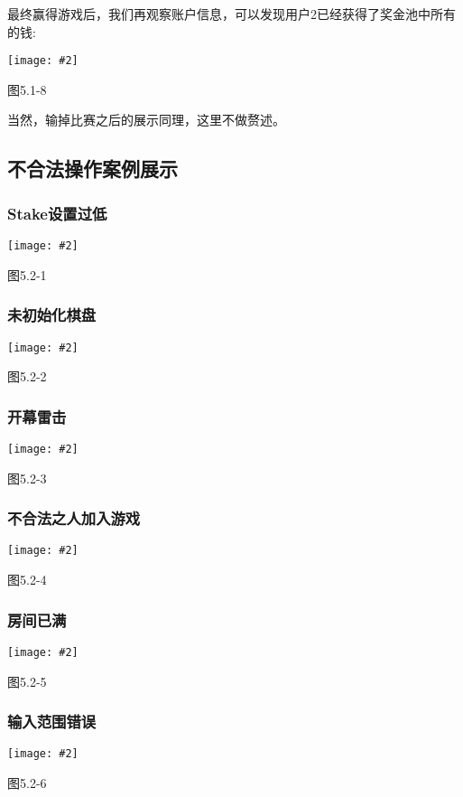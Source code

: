 \documentclass[UTF8]{ctexart}
\newcommand\picturehere[2][1]{\centerline{\texttt{[image: \#2]}}}
\begin{document}
	\indent 最终赢得游戏后，我们再观察账户信息，可以发现用户2已经获得了奖金池中所有的钱:\\
	\picturehere[1]{s20.png}
	\begin{center} 图5.1-8 \end{center} %

	\indent 当然，输掉比赛之后的展示同理，这里不做赘述。
	\newpage
	\subsection{不合法操作案例展示}
	\subsubsection{Stake设置过低}
	\picturehere[0.666]{s13.png}
	\begin{center} 图5.2-1 \end{center} %

	\subsubsection{未初始化棋盘}
	\picturehere[0.666]{s14.png}
	\begin{center} 图5.2-2 \end{center} %

	\subsubsection{开幕雷击}
	\picturehere[0.666]{s15.png}
	\begin{center} 图5.2-3 \end{center} %

	\subsubsection{不合法之人加入游戏}
	\picturehere[0.666]{s23.png}
	\begin{center} 图5.2-4 \end{center} %

		\subsubsection{房间已满}
		\picturehere[0.666]{s22.png}
		\begin{center} 图5.2-5 \end{center} %

		\newpage

		\subsubsection{输入范围错误}
		\picturehere[0.666]{s24.png}
		\begin{center} 图5.2-6 \end{center} %
\end{document}
